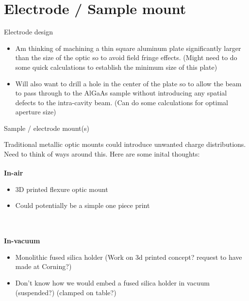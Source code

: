 \documentclass{beamer}
\begin{document}
\section{Electrode / Sample mount}
\begin{frame}{Electrode design}
\begin{itemize}
  \item Am thinking of machining a thin square aluminum plate significantly larger than the size of the optic so to avoid field fringe effects. (Might need to do some quick calculations to establish the minimum size of this plate)
  \item Will also want to drill a hole in the center of the plate so to allow the beam to pass through to the AlGaAs sample without introducing any spatial defects to the intra-cavity beam. (Can do some calculations for optimal aperture size)
\end{itemize}
\end{frame}

\begin{frame}{Sample / electrode mount(s)}
  \item Traditional metallic optic mounts could introduce unwanted charge distributions. Need to think of ways around this. Here are some inital thoughts:
\\~\\
\textbf{In-air}
\begin{itemize}
    \item 3D printed flexure optic mount
    \item Could potentially be a simple one piece print
\end{itemize}
\\~\\
\textbf{In-vacuum}
\begin{itemize}
    \item Monolithic fused silica holder (Work on 3d printed concept? request to have made at Corning?)
    \item Don’t know how we would embed a fused silica holder in vacuum (suspended?) (clamped on table?)
\end{itemize}
\end{frame}
\end{document}
